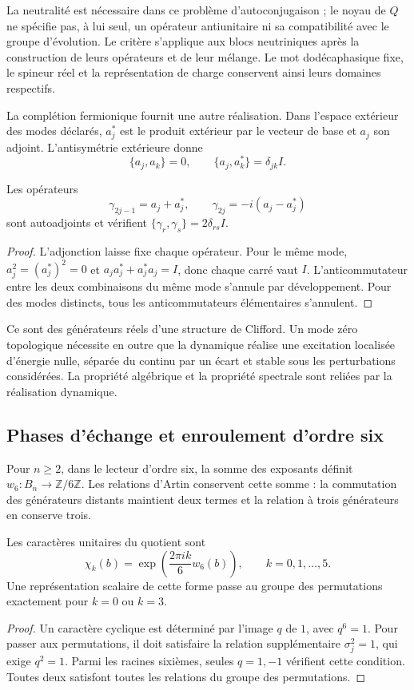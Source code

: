 La neutralité est nécessaire dans ce problème d’autoconjugaison ;
le noyau de $Q$ ne spécifie pas, à lui seul, un opérateur antiunitaire
ni sa compatibilité avec le groupe d’évolution. Le critère s’applique aux
blocs neutriniques après la construction de leurs opérateurs et de leur mélange.
Le mot dodécaphasique fixe, le spineur réel et la représentation de
charge conservent ainsi leurs domaines respectifs.

La complétion fermionique fournit une autre réalisation. Dans
l’espace extérieur des modes déclarés, $a_j^*$ est le produit
extérieur par le vecteur de base et $a_j$ son adjoint. L’antisymétrie
extérieure donne
\[
 \{a_j,a_k\}=0,\qquad \{a_j,a_k^*\}=\delta_{jk}I.
\]

\begin{proposition}
\label{vi:vi:prop:car-real}
Les opérateurs
\[
 \gamma_{2j-1}=a_j+a_j^*,\qquad
 \gamma_{2j}=-i(a_j-a_j^*)
\]
sont autoadjoints et vérifient $\{\gamma_r,\gamma_s\}=2\delta_{rs}I$.
\end{proposition}
\begin{proof}
L’adjonction laisse fixe chaque opérateur. Pour le même mode,
$a_j^2=(a_j^*)^2=0$ et $a_ja_j^*+a_j^*a_j=I$, donc chaque
carré vaut $I$. L’anticommutateur entre les deux combinaisons
du même mode s’annule par développement. Pour des modes distincts,
tous les anticommutateurs élémentaires s’annulent.
\end{proof}

Ce sont des générateurs réels d’une structure de Clifford. Un mode
zéro topologique nécessite en outre que la dynamique réalise une excitation
localisée d’énergie nulle, séparée du continu par un écart et
stable sous les perturbations considérées. La propriété algébrique
et la propriété spectrale sont reliées par la réalisation dynamique.

\subsection{Phases d’échange et enroulement d’ordre six}

Pour \(n\ge2\), dans le lecteur d’ordre six, la somme des exposants définit
$w_6:B_n\to\mathbb Z/6\mathbb Z$. Les relations d’Artin
conservent cette somme : la commutation des générateurs distants maintient
deux termes et la relation à trois générateurs en conserve trois.

\begin{proposition}
\label{vi:vi:prop:devanado-seis}
Les caractères unitaires du quotient sont
\[
 \chi_k(b)=\exp\!\left(\frac{2\pi i k}{6}w_6(b)\right),
 \qquad k=0,1,\ldots,5.
\]
Une représentation scalaire de cette forme passe au groupe des
permutations exactement pour $k=0$ ou $k=3$.
\end{proposition}
\begin{proof}
Un caractère cyclique est déterminé par l’image $q$ de $1$,
avec $q^6=1$. Pour passer aux permutations, il doit satisfaire la
relation supplémentaire $\sigma_j^2=1$, qui exige $q^2=1$.
Parmi les racines sixièmes, seules $q=1,-1$ vérifient cette condition.
Toutes deux satisfont toutes les relations du groupe des permutations.
\end{proof}

